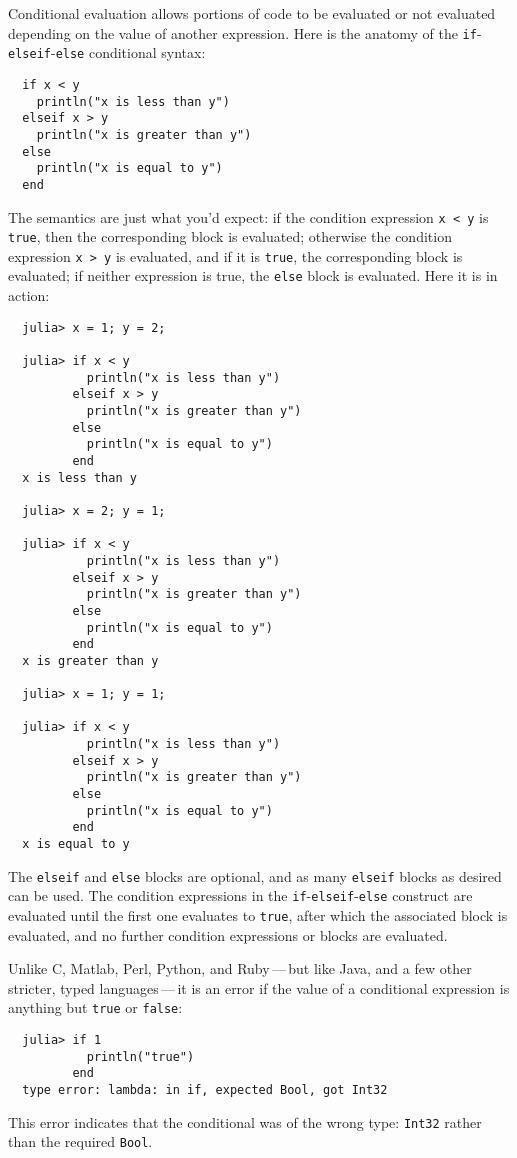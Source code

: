 \documentclass{article}
\begin{document}
Conditional evaluation allows portions of code to be evaluated or not evaluated depending on the value of another expression.
Here is the anatomy of the \verb|if|-\verb|elseif|-\verb|else| conditional syntax:
\begin{verbatim}
  if x < y
    println("x is less than y")
  elseif x > y
    println("x is greater than y")
  else
    println("x is equal to y")
  end
\end{verbatim}
The semantics are just what you'd expect:
if the condition expression \verb|x < y| is \verb|true|, then the corresponding block is evaluated;
otherwise the condition expression \verb|x > y| is evaluated, and if it is \verb|true|, the corresponding block is evaluated;
if neither expression is true, the \verb|else| block is evaluated.
Here it is in action:
\begin{verbatim}
  julia> x = 1; y = 2;

  julia> if x < y
           println("x is less than y")
         elseif x > y
           println("x is greater than y")
         else
           println("x is equal to y")
         end
  x is less than y

  julia> x = 2; y = 1;

  julia> if x < y
           println("x is less than y")
         elseif x > y
           println("x is greater than y")
         else
           println("x is equal to y")
         end
  x is greater than y

  julia> x = 1; y = 1;

  julia> if x < y
           println("x is less than y")
         elseif x > y
           println("x is greater than y")
         else
           println("x is equal to y")
         end
  x is equal to y
\end{verbatim}
The \verb|elseif| and \verb|else| blocks are optional, and as many \verb|elseif| blocks as desired can be used.
The condition expressions in the \verb|if|-\verb|elseif|-\verb|else| construct are evaluated until the first one evaluates to \verb|true|, after which the associated block is evaluated, and no further condition expressions or blocks are evaluated.

Unlike C, Matlab, Perl, Python, and Ruby\,---\,but like Java, and a few other stricter, typed languages\,---\,it is an error if the value of a conditional expression is anything but \verb|true| or \verb|false|:
\begin{verbatim}
  julia> if 1
           println("true")
         end
  type error: lambda: in if, expected Bool, got Int32
\end{verbatim}
This error indicates that the conditional was of the wrong type:
\verb|Int32| rather than the required \verb|Bool|.
\end{document}
